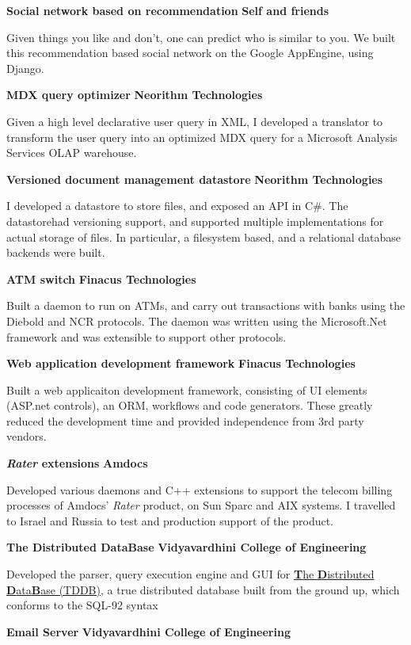 \documentclass[a4paper,11pt,final]{article}
\newcommand{\projexp}[2]{%
  \vspace{12pt}
  \noindent\textbf{{#1}}
  \hfill
  \textbf{{#2}}
  \\\vspace{-12pt}
}
\begin{document}
\projexp{Social network based on recommendation}{Self and friends}

\noindent Given things you like and don't, one can predict who is
similar to you. We built this recommendation based social network on
the Google AppEngine, using Django.

\projexp{MDX query optimizer}{Neorithm Technologies}

\noindent Given a high level declarative user query in XML, I developed a
translator to transform the user query into an optimized MDX query for
a Microsoft Analysis Services OLAP warehouse.

\projexp{Versioned document management datastore}{Neorithm Technologies}

\noindent I developed a datastore to store files, and exposed an API
in C\#. The datastorehad versioning support, and supported multiple
implementations for actual storage of files. In particular, a
filesystem based, and a relational database backends were built.

\projexp{ATM switch}{Finacus Technologies} 

\noindent Built a daemon to run on ATMs, and carry out transactions
with banks using the Diebold and NCR protocols. The daemon was written
using the Microsoft.Net framework and was extensible to support other
protocols.

\projexp{Web application development framework}{Finacus Technologies}

\noindent Built a web applicaiton development framework, consisting of
UI elements (ASP.net controls), an ORM, workflows and code
generators. These greatly reduced the development time and provided
independence from 3rd party vendors.

\projexp{\textit{Rater} extensions}{Amdocs} 

\noindent Developed various daemons and C++ extensions to support the
telecom billing processes of Amdocs' \textit{Rater} product, on Sun
Sparc and AIX systems. I travelled to Israel and Russia to test and
production support of the product.

\projexp{The Distributed DataBase}{Vidyavardhini College of
  Engineering} 

\noindent Developed the parser, query execution engine and GUI
for \href{http://tddb.sf.net} {\textbf{T}he \textbf{D}istributed
  \textbf{D}ata\textbf{B}ase (TDDB)}, a true distributed database
built from the ground up, which conforms to the SQL-92 syntax

\projexp{Email Server}{Vidyavardhini College of Engineering} 
\end{document}
